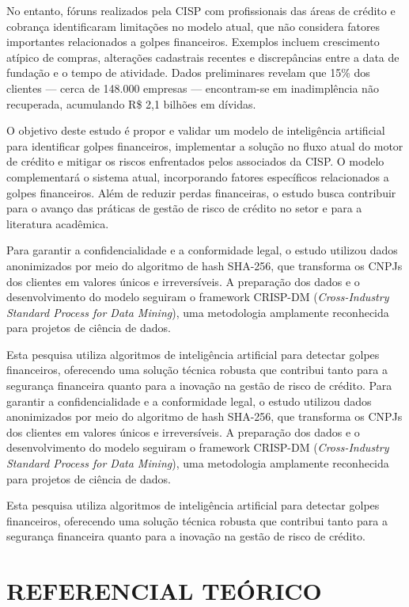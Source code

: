 \documentclass[12pt,a4paper]{article}
\begin{document}
No entanto, fóruns realizados pela CISP com profissionais das áreas de crédito e cobrança identificaram limitações no modelo atual, que não considera fatores importantes relacionados a golpes financeiros. Exemplos incluem crescimento atípico de compras, alterações cadastrais recentes e discrepâncias entre a data de fundação e o tempo de atividade. Dados preliminares revelam que 15\% dos clientes — cerca de 148.000 empresas — encontram-se em inadimplência não recuperada, acumulando R\$ 2,1 bilhões em dívidas.

O objetivo deste estudo é propor e validar um modelo de inteligência artificial para identificar golpes financeiros, implementar a solução no fluxo atual do motor de crédito e mitigar os riscos enfrentados pelos associados da CISP. O modelo complementará o sistema atual, incorporando fatores específicos relacionados a golpes financeiros. Além de reduzir perdas financeiras, o estudo busca contribuir para o avanço das práticas de gestão de risco de crédito no setor e para a literatura acadêmica.

Para garantir a confidencialidade e a conformidade legal, o estudo utilizou dados anonimizados por meio do algoritmo de hash SHA-256, que transforma os CNPJs dos clientes em valores únicos e irreversíveis. A preparação dos dados e o desenvolvimento do modelo seguiram o framework CRISP-DM (\textit{Cross-Industry Standard Process for Data Mining}), uma metodologia amplamente reconhecida para projetos de ciência de dados.

Esta pesquisa utiliza algoritmos de inteligência artificial para detectar golpes financeiros, oferecendo uma solução técnica robusta que contribui tanto para a segurança financeira quanto para a inovação na gestão de risco de crédito.
Para garantir a confidencialidade e a conformidade legal, o estudo utilizou dados anonimizados por meio do algoritmo de hash SHA-256, que transforma os CNPJs dos clientes em valores únicos e irreversíveis. A preparação dos dados e o desenvolvimento do modelo seguiram o framework CRISP-DM (\textit{Cross-Industry Standard Process for Data Mining}), uma metodologia amplamente reconhecida para projetos de ciência de dados.

Esta pesquisa utiliza algoritmos de inteligência artificial para detectar golpes financeiros, oferecendo uma solução técnica robusta que contribui tanto para a segurança financeira quanto para a inovação na gestão de risco de crédito.
\newpage
\section{REFERENCIAL TEÓRICO}
\label{sec:referencial}
\end{document}
